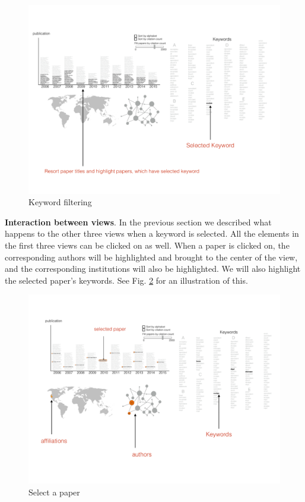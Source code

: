 \documentclass[dvips,12pt]{article}
\begin{document}
\begin{figure}[htb!]
    \centering
    \includegraphics[width=160mm]{visproposalDrawing_page_Part_4.pdf}
    \caption{Keyword filtering}
    \label{fig:click_keyword}
\end{figure}

\textbf{Interaction between views}. In the previous section we described what happens to the other three views when a keyword is selected. All the elements in the first three views can be clicked on as well. When a paper is clicked on, the corresponding authors will be highlighted and brought to the center of the view, and the corresponding institutions will also be highlighted. We will also highlight the selected paper's keywords. See Fig. \ref*{fig:select_paper} for an illustration of this.

\begin{figure}[htb!]
    \centering
    \includegraphics[width=160mm]{visproposalDrawing_page_Part_3.pdf}
    \caption{Select a paper}
    \label{fig:select_paper}
\end{figure}
\end{document}

